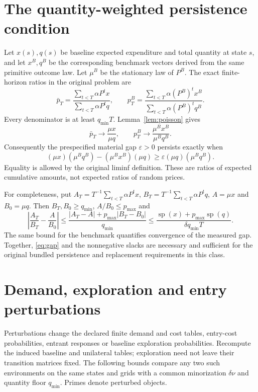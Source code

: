 \documentclass[11pt,a4paper]{article}
\newcommand{\spn}{\operatorname{sp}}
\begin{document}
\section{The quantity-weighted persistence condition}
Let $x(s),q(s)$ be baseline expected expenditure and total quantity at state
$s$, and let $x^B,q^B$ be the corresponding benchmark vectors derived from
the same primitive outcome law. Let $\mu^B$ be the stationary law of $P^B$.
The exact finite-horizon ratios in the original problem are
\[
 \bar p_T=\frac{\sum_{t<T}\alpha P^tx}{\sum_{t<T}\alpha P^tq},
 \qquad p_T^B=\frac{\sum_{t<T}\alpha(P^B)^tx^B}
                       {\sum_{t<T}\alpha(P^B)^tq^B}.
\]
Every denominator is at least $q_{\min}T$. Lemma~\ref{lem:poisson} gives
\begin{equation}\label{eq:pricelimit}
 \bar p_T\longrightarrow\frac{\mu x}{\mu q},\qquad
 p_T^B\longrightarrow\frac{\mu^Bx^B}{\mu^Bq^B}.
\end{equation}
Consequently the prespecified material gap $\varepsilon>0$ persists exactly when
\begin{equation}\label{eq:gap}
 (\mu x)(\mu^Bq^B)-(\mu^Bx^B)(\mu q)
 \geq\varepsilon(\mu q)(\mu^Bq^B).
\end{equation}
Equality is allowed by the original liminf definition. These are ratios of
expected cumulative amounts, not expected ratios of random prices.

For completeness, put $A_T=T^{-1}\sum_{t<T}\alpha P^tx$,
$B_T=T^{-1}\sum_{t<T}\alpha P^tq$, $A=\mu x$ and $B_0=\mu q$.
Then $B_T,B_0\geq q_{\min}$, $A/B_0\leq p_{\max}$ and
\[
 \left|\frac{A_T}{B_T}-\frac A{B_0}\right|
 \leq\frac{|A_T-A|+p_{\max}|B_T-B_0|}{q_{\min}}
 \leq\frac{\spn(x)+p_{\max}\spn(q)}{\delta q_{\min}T}.
\]
The same bound for the benchmark quantifies convergence of the measured gap.
Together, \eqref{eq:gap} and the nonnegative slacks are necessary and sufficient
for the original bundled persistence and replacement requirements in this class.

\section{Demand, exploration and entry perturbations}
Perturbations change the declared finite demand and cost tables, entry-cost
probabilities, entrant responses or baseline exploration probabilities. Recompute
the induced baseline and unilateral tables; exploration need not leave their
transition matrices fixed. The following bounds compare any two such environments
on the same states and grids with a common minorization $\delta\nu$ and quantity
floor $q_{\min}$. Primes denote perturbed objects.
\end{document}
